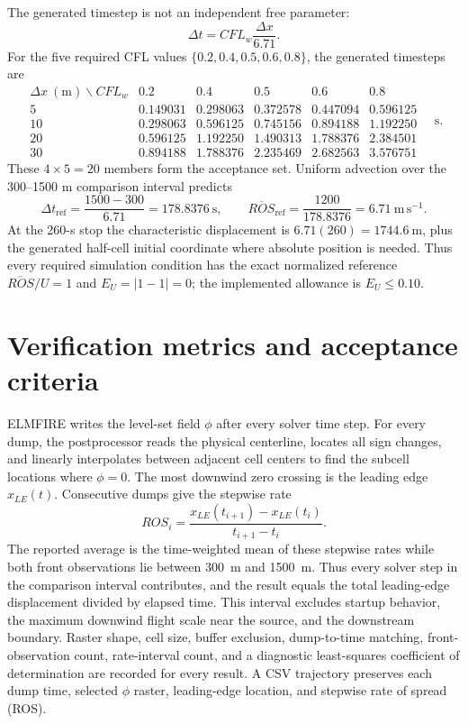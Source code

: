 The generated timestep is not an independent free parameter:
\[
 \Delta t=CFL_w\frac{\Delta x}{6.71}.
\]
For the five required CFL values \(\{0.2,0.4,0.5,0.6,0.8\}\), the generated
timesteps are
\[
\begin{array}{c|ccccc}
\Delta x~(\mathrm{m})\backslash CFL_w&0.2&0.4&0.5&0.6&0.8\\\hline
5&0.149031&0.298063&0.372578&0.447094&0.596125\\
10&0.298063&0.596125&0.745156&0.894188&1.192250\\
20&0.596125&1.192250&1.490313&1.788376&2.384501\\
30&0.894188&1.788376&2.235469&2.682563&3.576751
\end{array}
\quad\mathrm{s}.
\]
These \(4\times5=20\) members form the acceptance set.  Uniform advection over
the 300--1500 m comparison interval predicts
\[
 \Delta t_{\mathrm{ref}}=\frac{1500-300}{6.71}=178.8376~\mathrm{s},
 \qquad \overline{ROS}_{\mathrm{ref}}
 =\frac{1200}{178.8376}=6.71~\mathrm{m\,s^{-1}}.
\]
At the 260-s stop the characteristic displacement is
\(6.71(260)=1744.6~\mathrm{m}\), plus the generated half-cell initial
coordinate where absolute position is needed.  Thus every required simulation condition
has the exact normalized reference
\(\overline{ROS}/U=1\) and \(E_U=|1-1|=0\); the implemented allowance is
\(E_U\leq0.10\).

\section{Verification metrics and acceptance criteria}
ELMFIRE writes the level-set field \(\phi\) after every solver time step.
For every dump, the postprocessor reads the physical centerline, locates all
sign changes, and linearly interpolates between adjacent cell centers to find
the subcell locations where \(\phi=0\).  The most downwind zero crossing is
the leading edge \(x_{LE}(t)\).  Consecutive dumps give the stepwise rate
\begin{equation}
  ROS_i = \frac{x_{LE}(t_{i+1})-x_{LE}(t_i)}{t_{i+1}-t_i}.
\end{equation}
The reported average is the time-weighted mean of these stepwise rates while
both front observations lie between \SI{300}{m} and \SI{1500}{m}.  Thus every
solver step in the comparison interval contributes, and the result equals
the total leading-edge displacement divided by elapsed time.  This interval
excludes startup behavior, the maximum downwind flight scale near the source,
and the downstream boundary.  Raster shape, cell size, buffer exclusion,
dump-to-time matching, front-observation count, rate-interval count, and a
diagnostic least-squares coefficient of determination are recorded for every
result.  A CSV trajectory preserves each dump time, selected \(\phi\) raster,
leading-edge location, and stepwise rate of spread (ROS).

